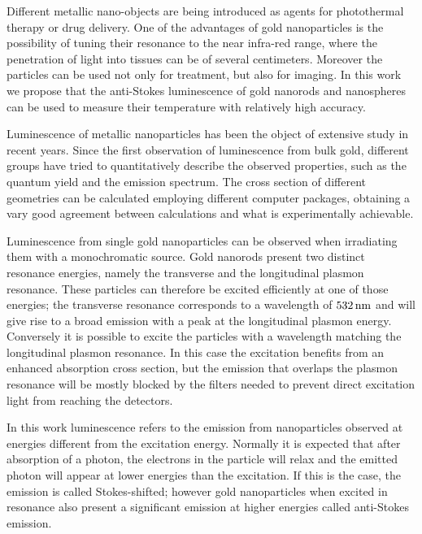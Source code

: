 Different metallic nano-objects are being introduced as agents for photothermal
therapy or drug delivery\cite{Kang2013,Huang2006,Huang2008}. One of the
advantages of gold nanoparticles is the possibility of tuning their resonance to
the near infra-red range, where the penetration of light into tissues can be of
several
centimeters\cite{Huang2006,Gobin2007,Hirsch2003,ONeal2004,Li2013c,Huang2008}.
Moreover the particles can be used not only for treatment, but also for
imaging\cite{Zhao2014a,Huang2006}. In this work we propose that the anti-Stokes
luminescence of gold nanorods and nanospheres can be used to measure their
temperature with relatively high accuracy.

Luminescence of metallic nanoparticles has been the object of extensive study in
recent years. Since the first observation of luminescence from bulk
gold\cite{Mooradian1969}, different groups have tried to quantitatively describe
the observed properties\cite{Mohamed2000,Beversluis2003a}, such as the quantum
yield\cite{Fang2012,Rao2015,Yorulmaz2012,Cheng2015,Dulkeith2004} and the
emission spectrum\cite{Link2010}. The cross section of different geometries can
be calculated employing different computer
packages\cite{Yurkin2011,Draine1994,Oskooi2010}, obtaining a vary good agreement
between calculations and what is experimentally achievable.

Luminescence from single gold nanoparticles can be observed when
irradiating them with a monochromatic source. Gold nanorods present two distinct
resonance energies, namely the transverse and the longitudinal plasmon
resonance. These particles can therefore be excited efficiently at one of those
energies; the transverse resonance corresponds to a wavelength of $532\,\textrm{nm}$ and will give
rise to a broad emission with a peak at the longitudinal plasmon energy.
Conversely it is possible to excite the particles with a wavelength matching
the longitudinal plasmon resonance. In this case the excitation benefits from
an enhanced absorption cross section, but the emission that overlaps the plasmon
resonance will be mostly blocked by the filters needed to prevent direct
excitation light from reaching the detectors.

In this work luminescence refers to the emission from nanoparticles observed at
energies different from the excitation energy. Normally it is expected that
after absorption of a photon, the electrons in the particle will relax and the
emitted photon will appear at lower energies than the excitation. If this is the
case, the emission is called Stokes-shifted; however gold nanoparticles when
excited in resonance also present a significant emission at higher energies
called anti-Stokes emission\cite{He2015,Jiang2013,Carattino2016a}.


